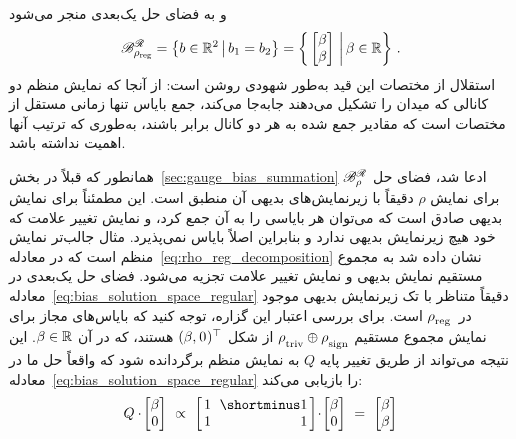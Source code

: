 و به فضای حل یک‌بعدی منجر می‌شود
\begin{align}\label{eq:bias_solution_space_regular}
	\mathscr{B}^{\Flip}_{\scalebox{.8}{$\rho_{{\textup{reg}}}$}} = 
	\big\{ b\in\R^2 \,\big|\, b_1=b_2 \big\} =
	\bigg\{ \begin{bmatrix} \beta \\ \beta \end{bmatrix} \,\bigg|\, \beta\in\R \bigg\} \ .
\end{align}
استقلال از مختصات این قید به‌طور شهودی روشن است:
از آنجا که نمایش منظم دو کانالی که میدان را تشکیل می‌دهند جابه‌جا می‌کند، جمع بایاس تنها زمانی مستقل از مختصات است که مقادیر جمع شده به هر دو کانال برابر باشند، به‌طوری که ترتیب آنها اهمیت نداشته باشد.

همانطور که قبلاً در بخش~\ref{sec:gauge_bias_summation} ادعا شد، فضای حل $\mathscr{B}^{\mathscr{R}}_\rho$ برای نمایش $\rho$ دقیقاً با زیرنمایش‌های بدیهی آن منطبق است.
این مطمئناً برای نمایش بدیهی صادق است که می‌توان هر بایاسی را به آن جمع کرد، و نمایش تغییر علامت که خود هیچ زیرنمایش بدیهی ندارد و بنابراین اصلاً بایاس نمی‌پذیرد.
مثال جالب‌تر نمایش منظم است که در معادله~\ref{eq:rho_reg_decomposition} نشان داده شد به مجموع مستقیم نمایش بدیهی و نمایش تغییر علامت تجزیه می‌شود.
فضای حل یک‌بعدی در معادله~\ref{eq:bias_solution_space_regular} دقیقاً متناظر با تک زیرنمایش بدیهی موجود در~$\rho_{\overset{}{\textup{reg}}}$ است.
برای بررسی اعتبار این گزاره، توجه کنید که بایاس‌های مجاز برای نمایش مجموع مستقیم $\rho_{\overset{}{\textup{triv}}} \oplus \rho_{\overset{}{\textup{sign}}}$ از شکل $(\beta,\mkern1mu 0\mkern1mu)^\top$ هستند، که در آن $\beta\in\mathbb{R}$.
این نتیجه می‌تواند از طریق تغییر پایه $Q$ به نمایش منظم برگردانده شود که واقعاً حل ما در معادله~\eqref{eq:bias_solution_space_regular} را بازیابی می‌کند:
\begin{align}
	Q \cdot\mkern-2mu \begin{bmatrix} \beta \\ 0 \end{bmatrix}
	\ \propto\ 
	\begin{bmatrix} \hspace{1.5pt}
		1 &\mkern-7mu \shortminus1 \hspace*{1.5pt} \\ \hspace{1.5pt} 1 &\mkern-7mu \phantom{\shortminus}1 \hspace*{1.5pt}
	\end{bmatrix}
	\!\cdot\! \begin{bmatrix} \beta \\ 0 \end{bmatrix}
	\ =\ 
	\begin{bmatrix} \beta \\ \beta \end{bmatrix}
\end{align}





